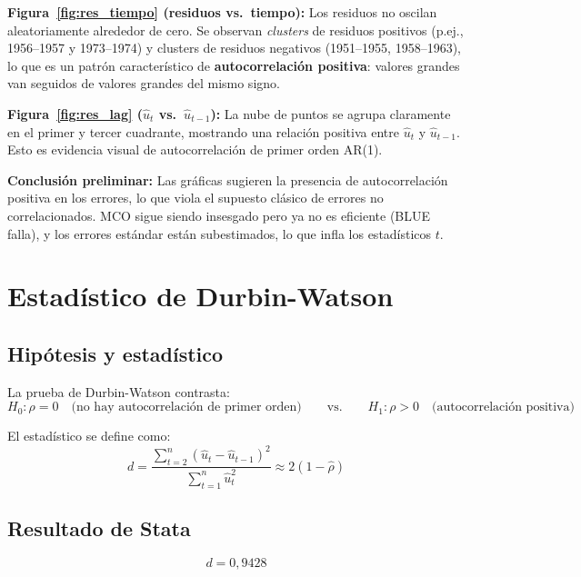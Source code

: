 \documentclass[12pt,a4paper]{article}
\newcommand{\Hcero}{H_0}
\newcommand{\Huno}{H_1}
\begin{document}
\textbf{Figura~\ref{fig:res_tiempo} (residuos vs.\ tiempo):}
Los residuos no oscilan aleatoriamente alrededor de cero. Se observan
\emph{clusters} de residuos positivos (p.ej., 1956--1957 y 1973--1974) y
clusters de residuos negativos (1951--1955, 1958--1963), lo que es un patrón
característico de \textbf{autocorrelación positiva}: valores grandes van
seguidos de valores grandes del mismo signo.

\textbf{Figura~\ref{fig:res_lag} ($\hat{u}_t$ vs.\ $\hat{u}_{t-1}$):}
La nube de puntos se agrupa claramente en el primer y tercer cuadrante,
mostrando una relación positiva entre $\hat{u}_t$ y $\hat{u}_{t-1}$.
Esto es evidencia visual de autocorrelación de primer orden AR(1).

\textbf{Conclusión preliminar:} Las gráficas sugieren la presencia de
autocorrelación positiva en los errores, lo que viola el supuesto clásico
de errores no correlacionados. MCO sigue siendo insesgado pero ya no es
eficiente (BLUE falla), y los errores estándar están subestimados, lo que
infla los estadísticos $t$.

\section{Estadístico de Durbin-Watson}
\label{sec:C}

\subsection{Hipótesis y estadístico}

La prueba de Durbin-Watson contrasta:
\[
  \Hcero: \rho = 0 \quad\text{(no hay autocorrelación de primer orden)}
  \qquad\text{vs.}\qquad
  \Huno: \rho > 0 \quad\text{(autocorrelación positiva)}
\]

El estadístico se define como:
\begin{equation}
  d = \frac{\displaystyle\sum_{t=2}^{n}(\hat{u}_t - \hat{u}_{t-1})^2}
           {\displaystyle\sum_{t=1}^{n}\hat{u}_t^2}
  \approx 2(1-\hat{\rho})
  \label{eq:dw}
\end{equation}

\subsection{Resultado de Stata}

\[
  \boxed{d = 0{,}9428}
\]
\end{document}

